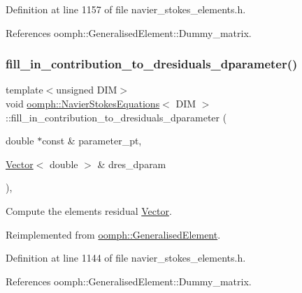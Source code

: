 Definition at line 1157 of file navier\+\_\+stokes\+\_\+elements.\+h.



References oomph\+::\+Generalised\+Element\+::\+Dummy\+\_\+matrix.

\mbox{\label{classoomph_1_1NavierStokesEquations_a2a7ca03e4f74fabe48dcd9da0fa6d185}} 
\subsubsection{\texorpdfstring{fill\+\_\+in\+\_\+contribution\+\_\+to\+\_\+dresiduals\+\_\+dparameter()}{fill\_in\_contribution\_to\_dresiduals\_dparameter()}}
{\footnotesize\ttfamily template$<$unsigned D\+IM$>$ \\
void \hyperlink{classoomph_1_1NavierStokesEquations}{oomph\+::\+Navier\+Stokes\+Equations}$<$ D\+IM $>$\+::fill\+\_\+in\+\_\+contribution\+\_\+to\+\_\+dresiduals\+\_\+dparameter (\begin{DoxyParamCaption}\item[{double $\ast$const \&}]{parameter\+\_\+pt,  }\item[{\hyperlink{classoomph_1_1Vector}{Vector}$<$ double $>$ \&}]{dres\+\_\+dparam }\end{DoxyParamCaption})\hspace{0.3cm}{\ttfamily [inline]}, {\ttfamily [virtual]}}



Compute the element\textquotesingle{}s residual \hyperlink{classoomph_1_1Vector}{Vector}. 



Reimplemented from \hyperlink{classoomph_1_1GeneralisedElement_a64d31806fcbe7c5b689a3281932e8073}{oomph\+::\+Generalised\+Element}.



Definition at line 1144 of file navier\+\_\+stokes\+\_\+elements.\+h.



References oomph\+::\+Generalised\+Element\+::\+Dummy\+\_\+matrix.

